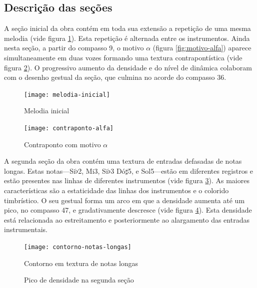 \subsection{Descrição das seções}
\label{sec:descricao-das-secoes}

A seção inicial da obra contém em toda sua extensão a repetição de uma
mesma melodia (vide figura \ref{fig:melodia-inicial}). Esta repetição
é alternada entre os instrumentos. Ainda nesta seção, a partir do
compasso 9, o motivo $\alpha$ (figura \ref{fig:motivo-alfa}) aparece
simultaneamente em duas vozes formando uma textura contrapontística
(vide figura \ref{fig:contraponto-alfa}). O progressivo aumento da
densidade e do nível de dinâmica colaboram com o desenho gestual da
seção, que culmina no acorde do compasso 36.

\begin{figure}
  \centering
  \texttt{[image: melodia-inicial]}
  \caption{Melodia inicial}
  \label{fig:melodia-inicial}
\end{figure}

\begin{figure}
  \centering
  \texttt{[image: contraponto-alfa]}
  \caption{Contraponto com motivo $\alpha$}
  \label{fig:contraponto-alfa}
\end{figure}

A segunda seção da obra contém uma textura de entradas defasadas de
notas longas. Estas notas---Si$\flat$2, Mi3, Si$\flat$3 Dó$\sharp$5, e
Sol5---estão em diferentes registros e estão presentes nas linhas de
diferentes instrumentos (vide figura
\ref{fig:contorno-notas-longas}). As maiores características são a
estaticidade das linhas dos instrumentos e o colorido timbrístico. O
seu gestual forma um arco em que a densidade aumenta até um pico, no
compasso 47, e gradativamente descresce (vide figura
\ref{fig:pico-densidade-secao-2}). Esta densidade está relacionada ao
estreitamento e posteriormente ao alargamento das entradas
instrumentais.

\begin{figure}
  \centering
  \texttt{[image: contorno-notas-longas]}
  \caption{Contorno em textura de notas longas}
  \label{fig:contorno-notas-longas}
\end{figure}

\begin{figure}
  \centering
  \caption{Pico de densidade na segunda seção}
  \label{fig:pico-densidade-secao-2}
\end{figure}

